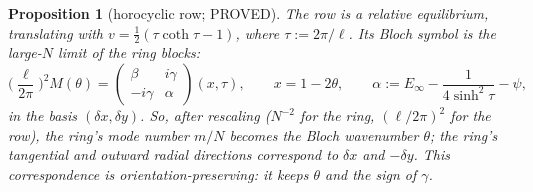 \documentclass[11pt]{article}
\newtheorem{proposition}[theorem]{Proposition}
\theoremstyle{remark}
\begin{document}
\begin{proposition}[horocyclic row; PROVED]\label{prop:row}
The row is a relative equilibrium, translating with $v=\frac12(\tau\coth\tau-1)$, where $\tau:=2\pi/\ell$. Its Bloch
symbol is the large-$N$ limit of the ring blocks:
\[
\Big(\frac\ell{2\pi}\Big)^2M(\theta)=\begin{pmatrix}\beta&i\gamma\\-i\gamma&\alpha\end{pmatrix}(x,\tau),\qquad x=1-2\theta,\qquad
\alpha:=E_\infty-\frac1{4\sinh^2\tau}-\psi,
\]
in the basis $(\delta x,\delta y)$. So, after rescaling ($N^{-2}$ for the ring, $(\ell/2\pi)^2$ for the row), the ring's mode
number $m/N$ becomes the Bloch wavenumber $\theta$; the ring's tangential and outward radial directions correspond to $\delta x$
and $-\delta y$. This correspondence is orientation-preserving: it keeps $\theta$ and the sign of $\gamma$.
\end{proposition}
\end{document}
